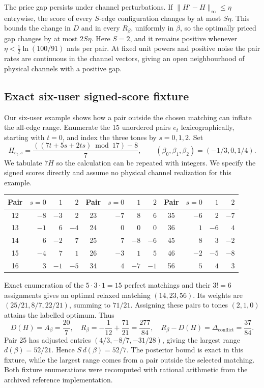 The price gap persists under channel perturbations. If \(\|H'-H\|_\infty\le\eta\) entrywise, the score of every \(S\)-edge configuration changes by at most \(S\eta\). This bounds the change in \(D\) and in every \(R_\beta\), uniformly in \(\beta\), so the optimally priced gap changes by at most \(2S\eta\). Here \(S=2\), and it remains positive whenever \(\eta<\tfrac12\ln(100/91)\) nats per pair. At fixed unit powers and positive noise the pair rates are continuous in the channel vectors, giving an open neighbourhood of physical channels with a positive gap.

\subsection{Exact six-user signed-score fixture}
Our six-user example shows how a pair outside the chosen matching can inflate the all-edge range. Enumerate the 15 unordered pairs $e_t$ lexicographically, starting with $t=0$, and index the three tones by $s=0,1,2$. Set
\begin{equation}
 H_{e_t,s}=\frac{((7t+5s+2ts)\bmod17)-8}{7},
 \qquad (\beta_0,\beta_1,\beta_2)=(-1/3,0,1/4).
 \label{supp:six-user-table}
\end{equation}
We tabulate $7H$ so the calculation can be repeated with integers. We specify the signed scores directly and assume no physical channel realization for this example.
\begin{center}
\setlength{\tabcolsep}{8pt}
\begin{tabular}{c|rrr@{\qquad}c|rrr@{\qquad}c|rrr}
Pair & $s=0$ & $1$ & $2$ & Pair & $s=0$ & $1$ & $2$ & Pair & $s=0$ & $1$ & $2$\\ \hline
12 & $-8$ & $-3$ & $2$ & 23 & $-7$ & $8$ & $6$ & 35 & $-6$ & $2$ & $-7$\\
13 & $-1$ & $6$ & $-4$ & 24 & $0$ & $0$ & $0$ & 36 & $1$ & $-6$ & $4$\\
14 & $6$ & $-2$ & $7$ & 25 & $7$ & $-8$ & $-6$ & 45 & $8$ & $3$ & $-2$\\
15 & $-4$ & $7$ & $1$ & 26 & $-3$ & $1$ & $5$ & 46 & $-2$ & $-5$ & $-8$\\
16 & $3$ & $-1$ & $-5$ & 34 & $4$ & $-7$ & $-1$ & 56 & $5$ & $4$ & $3$
\end{tabular}
\end{center}
Exact enumeration of the $5\cdot3\cdot1=15$ perfect matchings and their $3!=6$ assignments gives an optimal relaxed matching $(14,23,56)$. Its weights are $(25/21,8/7,22/21)$, summing to $71/21$. Assigning these pairs to tones $(2,1,0)$ attains the labelled optimum. Thus
\begin{equation}
 D(H)=A_\beta=\frac{20}{7},\quad
 R_\beta=-\frac1{12}+\frac{71}{21}=\frac{277}{84},\quad
 R_\beta-D(H)=\Delta_{\mathrm{conflict}}=\frac{37}{84}.
 \label{supp:six-user-values}
\end{equation}
Pair 25 has adjusted entries $(4/3,-8/7,-31/28)$, giving the largest range $d(\beta)=52/21$. Hence $S\,d(\beta)=52/7$. The posterior bound is exact in this fixture, while the largest range comes from a pair outside the selected matching. Both fixture enumerations were recomputed with rational arithmetic from the archived reference implementation.

